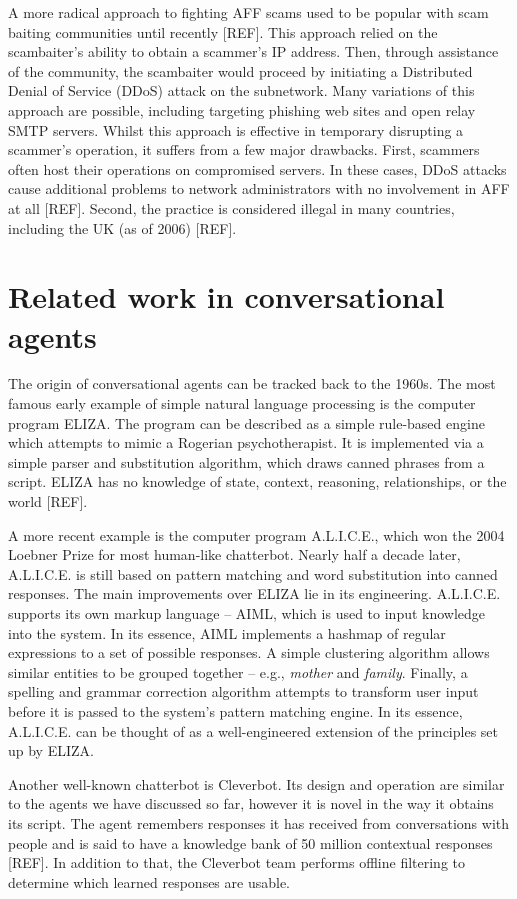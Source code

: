 A more radical approach to fighting AFF scams used to be popular with scam baiting communities until recently [REF]. This approach relied on the scambaiter's ability to obtain a scammer's IP address. Then, through assistance of the community, the scambaiter would proceed by initiating a Distributed Denial of Service (DDoS) attack on the subnetwork. Many variations of this approach are possible, including targeting phishing web sites and open relay SMTP servers. Whilst this approach is effective in temporary disrupting a scammer's operation, it suffers from a few major drawbacks. First, scammers often host their operations on compromised servers. In these cases, DDoS attacks cause additional problems to network administrators with no involvement in AFF at all [REF]. Second, the practice is considered illegal in many countries, including the UK (as of 2006) [REF].

\section{Related work in conversational agents}
The origin of conversational agents can be tracked back to the 1960s. The most famous early example of simple natural language processing is the computer program ELIZA. The program can be described as a simple rule-based engine which attempts to mimic a Rogerian psychotherapist. It is implemented via a simple parser and substitution algorithm, which draws canned phrases from a script. ELIZA has no knowledge of state, context, reasoning, relationships, or the world [REF].

A more recent example is the computer program A.L.I.C.E., which won the 2004 Loebner Prize for most human-like chatterbot. Nearly half a decade later, A.L.I.C.E. is still based on pattern matching and word substitution into canned responses. The main improvements over ELIZA lie in its engineering. A.L.I.C.E. supports its own markup language -- AIML, which is used to input knowledge into the system. In its essence, AIML implements a hashmap of regular expressions to a set of possible responses. A simple clustering algorithm allows similar entities to be grouped together -- e.g., \emph{mother} and \emph{family}. Finally, a spelling and grammar correction algorithm attempts to transform user input before it is passed to the system's pattern matching engine. In its essence, A.L.I.C.E. can be thought of as a well-engineered extension of the principles set up by ELIZA.

Another well-known chatterbot is Cleverbot. Its design and operation are similar to the agents we have discussed so far, however it is novel in the way it obtains its script. The agent remembers responses it has received from conversations with people and is said to have a knowledge bank of 50 million contextual responses [REF]. In addition to that, the Cleverbot team performs offline filtering to determine which learned responses are usable.

